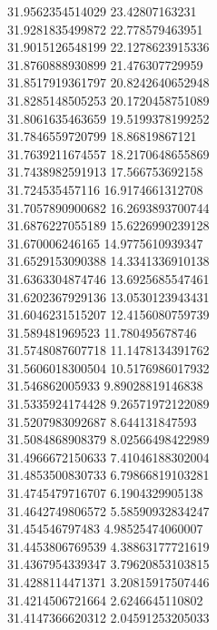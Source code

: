 {31.9562354514029	23.42807163231\\
31.9281835499872	22.778579463951\\
31.9015126548199	22.1278623915336\\
31.8760888930899	21.476307729959\\
31.8517919361797	20.8242640652948\\
31.8285148505253	20.1720458751089\\
31.8061635463659	19.5199378199252\\
31.7846559720799	18.86819867121\\
31.7639211674557	18.2170648655869\\
31.7438982591913	17.566753692158\\
31.724535457116	16.9174661312708\\
31.7057890900682	16.2693893700744\\
31.6876227055189	15.6226990239128\\
31.670006246165	14.9775610939347\\
31.6529153090388	14.3341336910138\\
31.6363304874746	13.6925685547461\\
31.6202367929136	13.0530123943431\\
31.6046231515207	12.4156080759739\\
31.589481969523	11.780495678746\\
31.5748087607718	11.1478134391762\\
31.5606018300504	10.5176986017932\\
31.546862005933	9.89028819146838\\
31.5335924174428	9.26571972122089\\
31.5207983092687	8.644131847593\\
31.5084868908379	8.02566498422989\\
31.4966672150633	7.41046188302004\\
31.4853500830733	6.79866819103281\\
31.4745479716707	6.1904329905138\\
31.4642749806572	5.58590932834247\\
31.454546797483	4.98525474060007\\
31.4453806769539	4.38863177721619\\
31.4367954339347	3.79620853103815\\
31.4288114471371	3.20815917507446\\
31.4214506721664	2.6246645110802\\
31.4147366620312	2.04591253205033\\
}
